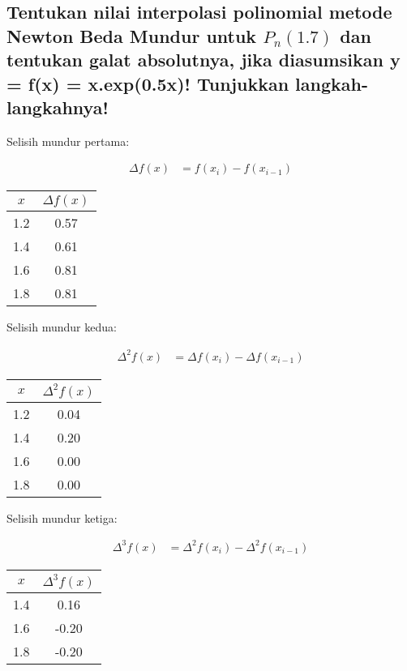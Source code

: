 \documentclass{article}
\begin{document}
\subsection{Tentukan nilai interpolasi polinomial metode Newton Beda Mundur untuk $P_n(1.7)$ dan
tentukan galat absolutnya, jika diasumsikan y = f(x) = x.exp(0.5x)! Tunjukkan langkah-langkahnya!}

Selisih mundur pertama:

\begin{align*}
    \Delta f(x) &= f(x_i) - f(x_{i-1})
\end{align*}

\begin{center}
\begin{tabular}{|c|c|}
    \hline
    $x$ & $\Delta f(x)$ \\
    \hline
    1.2 & 0.57 \\
    1.4 & 0.61 \\
    1.6 & 0.81 \\
    1.8 & 0.81 \\
    \hline
\end{tabular}
\end{center}

Selisih mundur kedua:

\begin{align*}
    \Delta^2 f(x) &= \Delta f(x_i) - \Delta f(x_{i-1})
\end{align*}

\begin{center}
\begin{tabular}{|c|c|}
    \hline
    $x$ & $\Delta^2 f(x)$ \\
    \hline
    1.2 & 0.04 \\
    1.4 & 0.20 \\
    1.6 & 0.00 \\
    1.8 & 0.00 \\
    \hline
\end{tabular}
\end{center}

Selisih mundur ketiga:

\begin{align*}
    \Delta^3 f(x) &= \Delta^2 f(x_i) - \Delta^2 f(x_{i-1})
\end{align*}

\begin{center}
\begin{tabular}{|c|c|}
    \hline
    $x$ & $\Delta^3 f(x)$ \\
    \hline
    1.4 & 0.16 \\
    1.6 & -0.20 \\
    1.8 & -0.20 \\
    \hline
\end{tabular}
\end{center}
\end{document}
